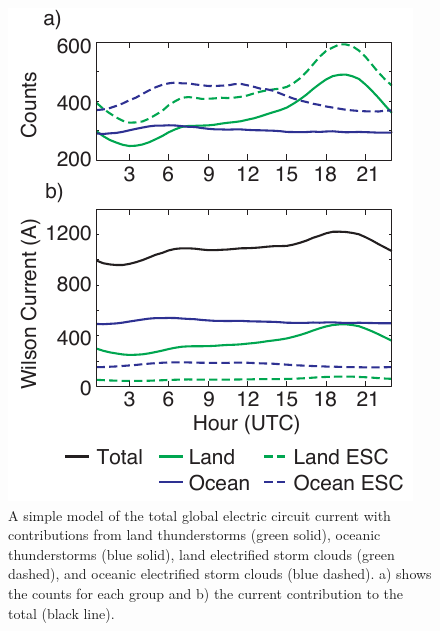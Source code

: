   \begin{figure}[ht!]
    \centering
    \includegraphics[scale=1]{GEC/Figures/wilson.pdf} 
    \caption{A simple model of the total global electric circuit current with contributions from land thunderstorms (green solid), oceanic thunderstorms (blue solid), land electrified storm clouds (green dashed), and oceanic electrified storm clouds (blue dashed).
    		a) shows the counts for each group and b) the current contribution to the total (black line).
		}
    \label{wilson}
 \end{figure}
